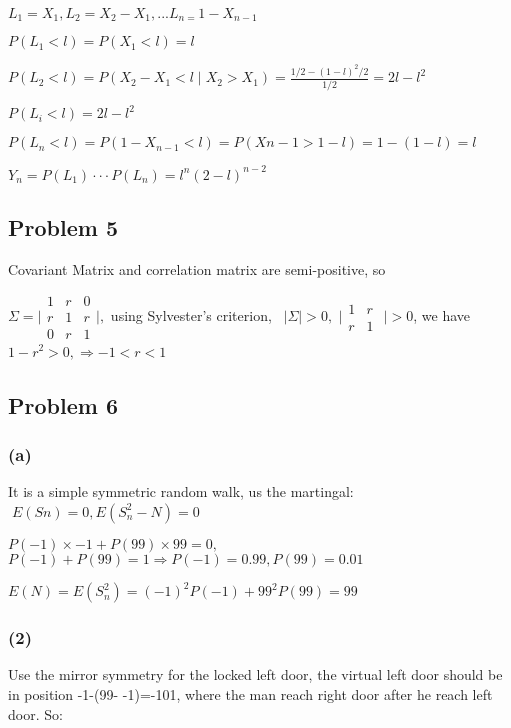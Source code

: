\documentclass[10pt]{article}
\begin{document}
$L_{1} =X_{1} ,L_{2} =X_{2} -X_{1} ,...L_{n =}1 -X_{n -1}$

$P(L_{1} <l) =P(X_{1} <l) =l$

$P(L_{2} <l) =P(X_{2} -X_{1} <l \mid X_{2} >X_{1}) =\frac{1/2 -(1 -l)^{2}/2}{1/2} =2l -l^{2}$

$P(L_{i} <l) =2l -l^{2}$

$P(L_{n} <l) =P(1 -X_{n -1} <l) =P(Xn-1 >1 -l) =1 -(1 -l) =l$

$Y_{n} =P(L_{1}) \cdot  \cdot  \cdot P(L_{n}) =l^{n}(2 -l)^{n -2}$

\subsection*{Problem 5~}
Covariant Matrix and correlation matrix are semi-positive, so

$\Sigma  = \mid \begin{array}{ccc}1 & r & 0 \\
r & 1 & r \\
0 & r & 1\end{array}$$ \mid  ,$ using Sylvester's criterion,~ $\mid \Sigma \mid  >0 ,$ $ \mid \begin{array}{cc}1 & r \\
r & 1\end{array}$   $ \mid  >0$, we have $1 -r^{2} >0 , \Longrightarrow  -1 <r <1$~

\subsection*{Problem 6~}

\subsubsection*{(a)}
It is a simple symmetric random walk, us the martingal: {\ensuremath{_{\textrm{}}}}$\;E(Sn)=0 ,E(S_{n}^{2} -N) =0$~

$P( -1) \times  -1 +P(99) \times 99 =0 ,$ $P( -1) +P(99) =1 \Longrightarrow P( -1) =0.99 ,P(99) =0.01$

$E(N) =E(S_{n}^{2}) =( -1)^{2}P( -1) +99^{2}P(99) =99$

\subsubsection*{(2)}
Use the mirror symmetry for the locked left door, the virtual left door should be in position -1-(99- -1)=-101, where the man reach right door after he reach left door. So:
\end{document}
